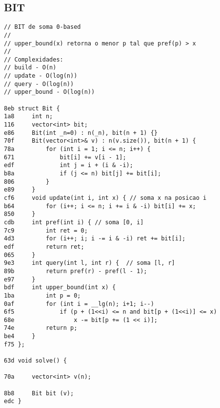 \documentclass[11pt, a4paper, twoside]{article}
\begin{document}
\subsection{BIT}
\begin{lstlisting}
// BIT de soma 0-based
// 
// upper_bound(x) retorna o menor p tal que pref(p) > x 
//
// Complexidades:
// build - O(n)
// update - O(log(n))
// query - O(log(n))
// upper_bound - O(log(n))

8eb struct Bit {
1a8 	int n;
116 	vector<int> bit;
e86 	Bit(int _n=0) : n(_n), bit(n + 1) {}
70f 	Bit(vector<int>& v) : n(v.size()), bit(n + 1) {
78a 		for (int i = 1; i <= n; i++) {
671 			bit[i] += v[i - 1];
edf 			int j = i + (i & -i);
b8a 			if (j <= n) bit[j] += bit[i];
806 		}
e89 	}
cf6 	void update(int i, int x) { // soma x na posicao i
b64 		for (i++; i <= n; i += i & -i) bit[i] += x;
850 	}
cdb 	int pref(int i) { // soma [0, i]
7c9 		int ret = 0;
4d3 		for (i++; i; i -= i & -i) ret += bit[i];
edf 		return ret;
065 	}
9e3 	int query(int l, int r) {  // soma [l, r]
89b 		return pref(r) - pref(l - 1); 
e97 	}
bdf 	int upper_bound(int x) {
1ba 		int p = 0;
0af 		for (int i = __lg(n); i+1; i--) 
6f5 			if (p + (1<<i) <= n and bit[p + (1<<i)] <= x)
68e 				x -= bit[p += (1 << i)];
74e 		return p;
be4 	}
f75 };

63d void solve() {
    
70a 	vector<int> v(n);
    
8b8 	Bit bit (v);
edc }
\end{lstlisting}
\end{document}
